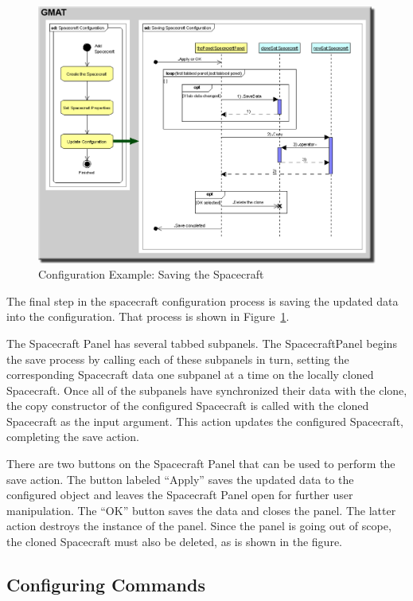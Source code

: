 \begin{figure}[htb]
\begin{center}
\includegraphics[scale=0.5]{Images/SpacecraftSave.eps}
\caption{\label{figure:SavingResource}Configuration Example: Saving the Spacecraft}
\end{center}
\end{figure}

The final step in the spacecraft configuration process is saving the updated data into the
configuration.  That process is shown in Figure~\ref{figure:SavingResource}.

The Spacecraft Panel has several tabbed subpanels.  The SpacecraftPanel begins the save process by
calling each of these subpanels in turn, setting the corresponding Spacecraft data one subpanel at a
time on the locally cloned Spacecraft.  Once all of the subpanels have synchronized their data with
the clone, the copy constructor of the configured Spacecraft is called with the cloned Spacecraft as
the input argument.  This action updates the configured Spacecraft, completing the save action.

There are two buttons on the Spacecraft Panel that can be used to perform the save action.  The
button labeled ``Apply'' saves the updated data to the configured object and leaves the Spacecraft
Panel open for further user manipulation.  The ``OK'' button saves the data and closes the panel.
The latter action destroys the instance of the panel.  Since the panel is going out of scope, the
cloned Spacecraft must also be deleted, as is shown in the figure.

\subsection{Configuring Commands}

